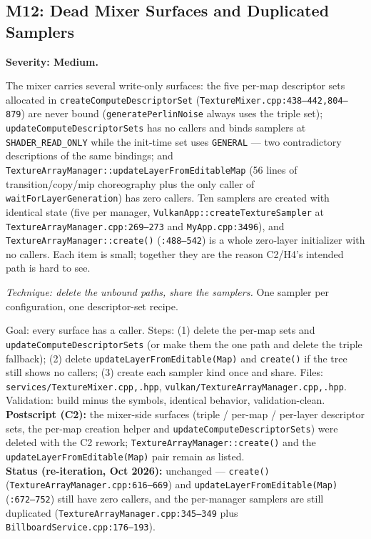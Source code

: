 \documentclass[11pt,a4paper]{article}
\begin{document}
\subsection{M12: Dead Mixer Surfaces and Duplicated Samplers}
\label{sec:m12}

\textbf{Severity: Medium.}

The mixer carries several write-only surfaces: the five per-map descriptor sets
allocated in \texttt{createComputeDescriptorSet} (\texttt{TextureMixer.cpp:438--442,804--879})
are never bound (\texttt{generatePerlinNoise} always uses the triple set);
\texttt{updateComputeDescriptorSets} has no callers and binds samplers at
\texttt{SHADER\_READ\_ONLY} while the init-time set uses \texttt{GENERAL} ---
two contradictory descriptions of the same bindings; and
\texttt{TextureArrayManager::updateLayerFromEditableMap} (56 lines of
transition/copy/mip choreography plus the only caller of
\texttt{waitForLayerGeneration}) has zero callers. Ten samplers are created
with identical state (five per manager, \texttt{VulkanApp::createTextureSampler}
at \texttt{TextureArrayManager.cpp:269--273} and \texttt{MyApp.cpp:3496}), and
\texttt{TextureArrayManager::create()} (\texttt{:488--542}) is a whole
zero-layer initializer with no callers. Each item is small; together they are
the reason C2/H4's intended path is hard to see.

\textit{Technique: delete the unbound paths, share the samplers.} One sampler
per configuration, one descriptor-set recipe.

\begin{tcolorbox}[promptbox={Prompt --- M12: one recipe per purpose}]
Goal: every surface has a caller. Steps: (1) delete the per-map sets and
\texttt{updateComputeDescriptorSets} (or make them the one path and delete the
triple fallback); (2) delete \texttt{updateLayerFromEditable(Map)} and
\texttt{create()} if the tree still shows no callers; (3) create each sampler
kind once and share. Files: \texttt{services/TextureMixer.cpp,.hpp},
\texttt{vulkan/TextureArrayManager.cpp,.hpp}. Validation: build minus the
symbols, identical behavior, validation-clean.
\\ \textbf{Postscript (C2):} the mixer-side surfaces (triple / per-map /
per-layer descriptor sets, the per-map creation helper and
\texttt{updateComputeDescriptorSets}) were deleted with the C2 rework;
\texttt{TextureArrayManager::create()} and the
\texttt{updateLayerFromEditable(Map)} pair remain as listed.
\\ \textbf{Status (re-iteration, Oct 2026):} unchanged --- \texttt{create()}
(\texttt{TextureArrayManager.cpp:616--669}) and
\texttt{updateLayerFromEditable(Map)} (\texttt{:672--752}) still have zero
callers, and the per-manager samplers are still duplicated
(\texttt{TextureArrayManager.cpp:345--349} plus
\texttt{BillboardService.cpp:176--193}).
\end{tcolorbox}
\end{document}

